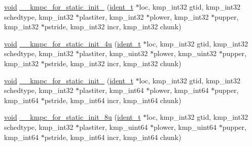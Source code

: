 \begin{DoxyCompactItemize}
\item 
\hyperlink{ittnotify__static_8h_af941d56e55e3c5465135b60c4d6343ed}{void} \hyperlink{group__WORK__SHARING_gab516cbd738ec072f4929faecbbc456f9}{\-\_\-\-\_\-kmpc\-\_\-for\-\_\-static\-\_\-init\-\_} (\hyperlink{group__BASIC__TYPES_ga690fda6b92f039a72db263c6b4394ddb}{ident\-\_\-t} $\ast$loc, kmp\-\_\-int32 gtid, kmp\-\_\-int32 schedtype, kmp\-\_\-int32 $\ast$plastiter, kmp\-\_\-int32 $\ast$plower, kmp\-\_\-int32 $\ast$pupper, kmp\-\_\-int32 $\ast$pstride, kmp\-\_\-int32 incr, kmp\-\_\-int32 chunk)
\item 
\hyperlink{ittnotify__static_8h_af941d56e55e3c5465135b60c4d6343ed}{void} \hyperlink{group__WORK__SHARING_ga305bbe90a798fdc8347aa809978365f5}{\-\_\-\-\_\-kmpc\-\_\-for\-\_\-static\-\_\-init\-\_\-4u} (\hyperlink{group__BASIC__TYPES_ga690fda6b92f039a72db263c6b4394ddb}{ident\-\_\-t} $\ast$loc, kmp\-\_\-int32 gtid, kmp\-\_\-int32 schedtype, kmp\-\_\-int32 $\ast$plastiter, kmp\-\_\-uint32 $\ast$plower, kmp\-\_\-uint32 $\ast$pupper, kmp\-\_\-int32 $\ast$pstride, kmp\-\_\-int32 incr, kmp\-\_\-int32 chunk)
\item 
\hyperlink{ittnotify__static_8h_af941d56e55e3c5465135b60c4d6343ed}{void} \hyperlink{group__WORK__SHARING_ga20f319fbf345661d19fc6bfd325231a5}{\-\_\-\-\_\-kmpc\-\_\-for\-\_\-static\-\_\-init\-\_} (\hyperlink{group__BASIC__TYPES_ga690fda6b92f039a72db263c6b4394ddb}{ident\-\_\-t} $\ast$loc, kmp\-\_\-int32 gtid, kmp\-\_\-int32 schedtype, kmp\-\_\-int32 $\ast$plastiter, kmp\-\_\-int64 $\ast$plower, kmp\-\_\-int64 $\ast$pupper, kmp\-\_\-int64 $\ast$pstride, kmp\-\_\-int64 incr, kmp\-\_\-int64 chunk)
\item 
\hyperlink{ittnotify__static_8h_af941d56e55e3c5465135b60c4d6343ed}{void} \hyperlink{group__WORK__SHARING_ga91d58a0a222e1f75e1d5d65b8ece3645}{\-\_\-\-\_\-kmpc\-\_\-for\-\_\-static\-\_\-init\-\_\-8u} (\hyperlink{group__BASIC__TYPES_ga690fda6b92f039a72db263c6b4394ddb}{ident\-\_\-t} $\ast$loc, kmp\-\_\-int32 gtid, kmp\-\_\-int32 schedtype, kmp\-\_\-int32 $\ast$plastiter, kmp\-\_\-uint64 $\ast$plower, kmp\-\_\-uint64 $\ast$pupper, kmp\-\_\-int64 $\ast$pstride, kmp\-\_\-int64 incr, kmp\-\_\-int64 chunk)
\end{DoxyCompactItemize}
